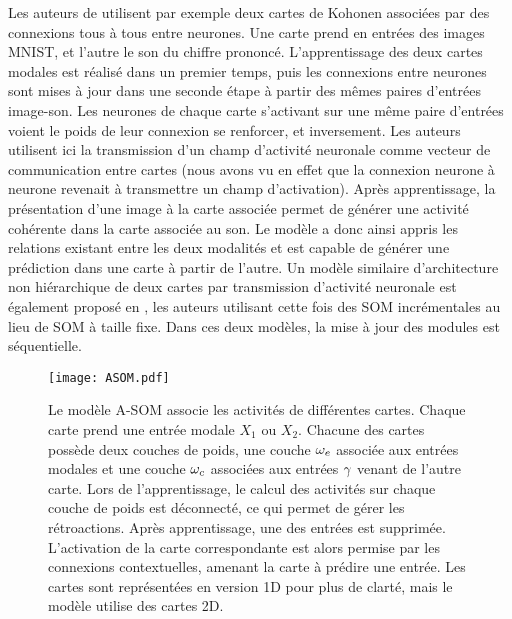 \documentclass[../main]{subfiles}
\begin{document}
Les auteurs de \cite{khacef_brain-inspired_2020} utilisent par exemple deux cartes de Kohonen associées par des connexions tous à tous entre neurones. Une carte prend en entrées des images MNIST, et l'autre le son du chiffre prononcé. L'apprentissage des deux cartes modales est réalisé dans un premier temps, puis les connexions entre neurones sont mises à jour dans une seconde étape à partir des mêmes paires d'entrées image-son. Les neurones de chaque carte s'activant sur une même paire d'entrées voient le poids de leur connexion se renforcer, et inversement. Les auteurs utilisent ici la transmission d'un champ d'activité neuronale comme vecteur de communication entre cartes (nous avons vu en effet que la connexion neurone à neurone revenait à transmettre un champ d'activation).
Après apprentissage, la présentation d'une image à la carte associée permet de générer une activité cohérente dans la carte associée au son. Le modèle a donc ainsi appris les relations existant entre les deux modalités et est capable de générer une prédiction dans une carte à partir de l'autre.
Un modèle similaire d'architecture non hiérarchique de deux cartes par transmission d'activité neuronale est également proposé en \cite{jayaratne_bio-inspired_2018}, les auteurs utilisant cette fois des SOM incrémentales au lieu de SOM à taille fixe. Dans ces deux modèles, la mise à jour des modules est séquentielle. 

\begin{figure}
    \centering\texttt{[image: ASOM.pdf]}
    \caption{Le modèle A-SOM \parencite{johnsson_associative_2009} associe les activités de différentes cartes. Chaque carte prend une entrée modale $X_1$ ou $X_2$. Chacune des cartes possède deux couches de poids, une couche $\omega_e$ associée aux entrées modales et une couche $\omega_c$ associées aux entrées $\gamma$ venant de l'autre carte. Lors de l'apprentissage, le calcul des activités sur chaque couche de poids est déconnecté, ce qui permet de gérer les rétroactions. 
    Après apprentissage, une des entrées est supprimée. L'activation de la carte correspondante est alors permise par les connexions contextuelles, amenant la carte à prédire une entrée. Les cartes sont représentées en version 1D pour plus de clarté, mais le modèle utilise des cartes 2D.
    \label{fig:asom}}
\end{figure}
\end{document}
